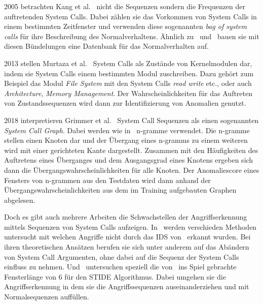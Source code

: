         2005 betrachten Kang et al.~\cite{FREQUENCY2} nicht die Sequenzen sondern die Frequenzen der auftretenden System Calls.
        Dabei zählen sie das Vorkommen von System Calls in einem bestimmten Zeitfenster und verwenden diese sogenannten \textit{bag of system calls} für ihre Beschreibung des Normalverhaltens.
        Ähnlich zu~\cite{FORREST} und~\cite{STIDE} bauen sie mit diesen Bündelungen eine Datenbank für das Normalverhalten auf.

        2013 stellen Murtaza et al.~\cite{SYSTEM_STATES} System Calls als Zustände von Kernelmodulen dar, indem sie System Calls einem bestimmten Modul zuschreiben.
        Dazu gehört zum Beispiel das Modul \textit{File System} mit den System Calls \textit{read} \textit{write} etc., oder auch \textit{Architecture}, \textit{Memory Management}.
        Der Wahrscheinlichkeiten für das Auftreten von Zustandssequenzen wird dann zur Identifizierung von Anomalien genutzt.

        2018 interpretieren Grimmer et al.~\cite{SYSCALL_GRAPHS} System Call Sequenzen als einen sogenannten \textit{System Call Graph}.
        Dabei werden wie in~\cite{STIDE_Alternatives} n-gramme verwendet.
        Die n-gramme stellen einen Knoten dar und der Übergang eines n-gramms zu einem weiteren wird mit einer gerichteten Kante dargestellt.
        Zusammen mit den Häufigkeiten des Auftretens eines Überganges und dem Ausgangsgrad eines Knotens ergeben sich dann die Übergangswahrscheinlichkeiten für alle Knoten.
        Der Anomaliescore eines Fensters von n-grammen aus den Testdaten wird dann anhand der Übergangswahrscheinlichkeiten aus dem im Training aufgebauten Graphen abgelesen.


    Doch es gibt auch mehrere Arbeiten die Schwachstellen der Angriffserkennung mittels Sequenzen von System Calls aufzeigen.
    In~\cite{Syscallseqexploit1} werden verschieden Methoden untersucht mit welchen Angriffe nicht durch das IDS von~\cite{FORREST2000} erkannt wurden.
    Bei ihren theoretischen Ansätzen berufen sie sich unter anderem auf das Abändern von System Call Argumenten, ohne dabei auf die Sequenz der System Calls einfluss zu nehmen.
    Und~\cite{Syscallseqexploit3} untersuchen speziell die von~\cite{FORREST} ins Spiel gebrachte Fensterlänge von $6$ für den \ac{STIDE} Algorithmus.
    Dabei umgehen sie die Angriffserkennung in dem sie die Angriffssequenzen auseinanderziehen und mit Normalsequenzen auffüllen.


